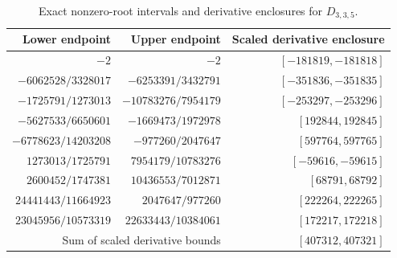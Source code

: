 \begin{table}[htbp]
\centering
\small
\setlength{\tabcolsep}{6pt}
\begin{tabular}{rrr}
\toprule
Lower endpoint & Upper endpoint & Scaled derivative enclosure\\
\midrule
$-2$ & $-2$ & $[-181819,-181818]$ \\
$-6062528/3328017$ & $-6253391/3432791$ & $[-351836,-351835]$ \\
$-1725791/1273013$ & $-10783276/7954179$ & $[-253297,-253296]$ \\
$-5627533/6650601$ & $-1669473/1972978$ & $[192844,192845]$ \\
$-6778623/14203208$ & $-977260/2047647$ & $[597764,597765]$ \\
$1273013/1725791$ & $7954179/10783276$ & $[-59616,-59615]$ \\
$2600452/1747381$ & $10436553/7012871$ & $[68791,68792]$ \\
$24441443/11664923$ & $2047647/977260$ & $[222264,222265]$ \\
$23045956/10573319$ & $22633443/10384061$ & $[172217,172218]$ \\
\midrule
\multicolumn{2}{r}{Sum of scaled derivative bounds} & $[407312,407321]$\\
\bottomrule
\end{tabular}
\caption{Exact nonzero-root intervals and derivative enclosures for $D_{3,3,5}$.}
\label{tab:335}
\end{table}

